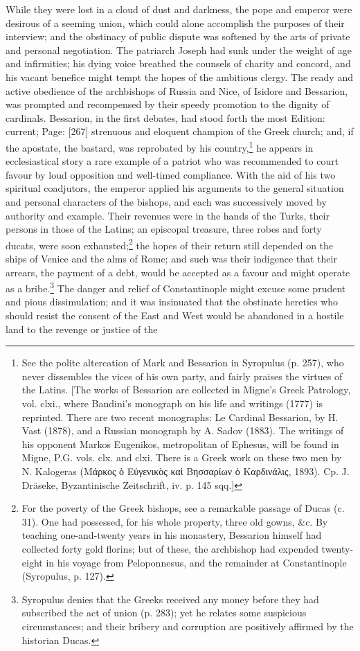 While they were lost in a cloud of dust and darkness, the pope and emperor were desirous of a seeming union, which could alone accomplish the purposes of their interview; and the obstinacy of public dispute was softened by the arts of private and personal negotiation. The patriarch Joseph had sunk under the weight of age and infirmities; his dying voice breathed the counsels of charity and concord, and his vacant benefice might tempt the hopes of the ambitious clergy. The ready and active obedience of the archbishops of Russia and Nice, of Isidore and Bessarion, was prompted and recompensed by their speedy promotion to the dignity of cardinals. Bessarion, in the first debates, had stood forth the most Edition: current; Page: [267] strenuous and eloquent champion of the Greek church; and, if the apostate, the bastard, was reprobated by his country,\footnote{See the polite altercation of Mark and Bessarion in Syropulus (p. 257), who never dissembles the vices of his own party, and fairly praises the virtues of the Latins. [The works of Bessarion are collected in Migne\texthebrew{}’s Greek Patrology, vol. clxi., where Bandini\texthebrew{}’s monograph on his life and writings (1777) is reprinted. There are two recent monographs: Le Cardinal Bessarion, by H. Vast (1878), and a Russian monograph by A. Sadov (1883). The writings of his opponent Markos Eugenikos, metropolitan of Ephesus, will be found in Migne, P.G. vols. clx. and clxi. There is a Greek work on these two men by N. Kalogeras (\textgreek{Μάρκος \texthebrew{ὁ} Ε\texthebrew{ὐ}γενικ\texthebrew{ὸ}ς κα\texthebrew{ὶ} Βησσαρίων \texthebrew{ὀ} Καρδινάλις}, 1893). Cp. J. Dräseke, Byzantinische Zeitschrift, iv. p. 145 sqq.]} he appears in ecclesiastical story a rare example of a patriot who was recommended to court favour by loud opposition and well-timed compliance. With the aid of his two spiritual coadjutors, the emperor applied his arguments to the general situation and personal characters of the bishops, and each was successively moved by authority and example. Their revenues were in the hands of the Turks, their persons in those of the Latins; an episcopal treasure, three robes and forty ducats, were soon exhausted;\footnote{For the poverty of the Greek bishops, see a remarkable passage of Ducas (c. 31). One had possessed, for his whole property, three old gowns, \&c. By teaching one-and-twenty years in his monastery, Bessarion himself had collected forty gold florins; but of these, the archbishop had expended twenty-eight in his voyage from Peloponnesus, and the remainder at Constantinople (Syropulus, p. 127).} the hopes of their return still depended on the ships of Venice and the alms of Rome; and such was their indigence that their arrears, the payment of a debt, would be accepted as a favour and might operate as a bribe.\footnote{Syropulus denies that the Greeks received any money before they had subscribed the act of union (p. 283); yet he relates some suspicious circumstances; and their bribery and corruption are positively affirmed by the historian Ducas.} The danger and relief of Constantinople might excuse some prudent and pious dissimulation; and it was insinuated that the obstinate heretics who should resist the consent of the East and West would be abandoned in a hostile land to the revenge or justice of the 